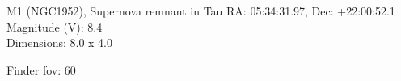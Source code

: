 \begin{block}{M1 (NGC1952), Supernova remnant in Tau}
    RA: 05:34:31.97, Dec: +22:00:52.1 \\ 
    Magnitude (V): 8.4 \\ 
    Dimensions: 8.0 x 4.0 

    Finder fov: 60 
\end{block}